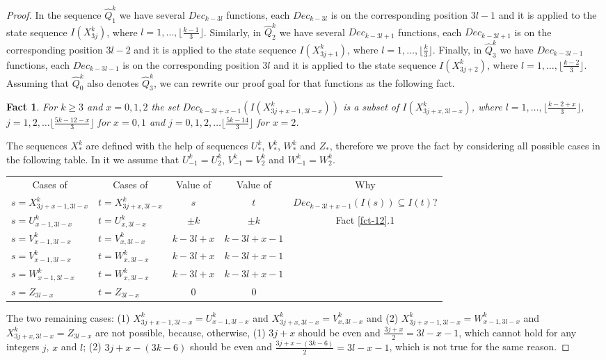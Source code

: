 \documentclass{llncs}
\newtheorem{fact}[theorem]{Fact}
\begin{document}
\begin{proof}
In the sequence $\hat{Q}^k_1$ we have several $Dec_{k-3l}$ functions, each
$Dec_{k-3l}$ is on the corresponding position $3l-1$ and it is applied to the
state sequence $I(X^k_{3j})$, where $l=1,\ldots,\lfloor\frac{k-1}{3} \rfloor$.
Similarly, in $\hat{Q}^k_2$ we have several $Dec_{k-3l+1}$ functions, each
$Dec_{k-3l+1}$ is on the corresponding position $3l-2$ and it is applied to the 
state sequence $I(X^k_{3j+1})$, where $l=1,\ldots,\lfloor\frac{k}{3} \rfloor$.
Finally, in $\hat{Q}^k_3$ we have $Dec_{k-3l-1}$ functions, each $Dec_{k-3l-1}$
is on the corresponding position $3l$ and it is applied to the state sequence
$I(X^k_{3j+2})$, where $l=1,\ldots,\lfloor\frac{k-2}{3}\rfloor$. Assuming that
$\hat{Q}^k_0$ also denotes $\hat{Q}^k_3$, we can rewrite our proof goal for that
functions as the following fact.
\begin{fact}
For $k\ge 3$ and $x=0,1,2$ the set $Dec_{k-3l+x-1}(I(X^k_{3j+x-1,3l-x}))$ is
a subset of $I(X^k_{3j+x,3l-x})$, where $l=1,\ldots,\lfloor\frac{k-2+x}{3}
\rfloor$, $j=1,2,\ldots\lfloor\frac{5k-12-x}{3}\rfloor$ for $x=0,1$ and
$j=0,1,2,\ldots\lfloor\frac{5k-14}{3}\rfloor$ for $x=2$.
\end{fact}
The sequences $X^k_*$ are defined with the help of sequences $U^k_*$, $V^k_*$,
$W^k_*$ and $Z_*$, therefore we prove the fact by considering all possible
cases in the following table. In it we assume that $U^k_{-1}=U^k_2$,
$V^k_{-1}=V^k_2$ and $W^k_{-1}=W^k_2$.
\setlength{\tabcolsep}{3pt}
\begin{center}
\begin{tabular}{||l|l||c|c||c||}
\hline\hline \multicolumn{1}{||c|}{Cases of} & 
      \multicolumn{1}{|c||}{Cases of} & Value of  & Value of  & Why  \\ 
      $s=X^k_{3j+x-1,3l-x}$  & $t=X^k_{3j+x,3l-x}$  & $s$  & $t$  & 
      $Dec_{k-3l+x-1}(I(s)) \subseteq I(t)$? \\ \hline
\hline $s=U^k_{x-1,3l-x}$ & $t=U^k_{x,3l-x}$ & $\pm k$  & $\pm k$  & 
      \multirow{5}{*}{Fact \ref{fct-12}.1}  \\ 
\cline{1-4} $s=V^k_{x-1,3l-x}$ & $t=V^k_{x,3l-x}$ & $k-3l+x$ & $k-3l+x-1$ &\\ 
\cline{1-4} $s=V^k_{x-1,3l-x}$ & $t=W^k_{x,3l-x}$ & $k-3l+x$ & $k-3l+x-1$ &\\ 
\cline{1-4} $s=W^k_{x-1,3l-x}$ & $t=W^k_{x,3l-x}$ & $k-3l+x$ & $k-3l+x-1$ &\\ 
\cline{1-4} $s=Z_{3l-x}$ & $t=Z_{3l-x}$ & 0 & 0 & \\ 
\hline\hline 
\end{tabular}
\end{center}
The two remaining cases: (1) $X^k_{3j+x-1,3l-x} = U^k_{x-1,3l-x}$ and 
$X^k_{3j+x,3l-x} = V^k_{x,3l-x}$ and (2) $X^k_{3j+x-1,3l-x} = W^k_{x-1,3l-x}$ 
and $X^k_{3j+x,3l-x} = Z_{3l-x}$ are not possible, because, otherwise, (1) 
$3j+x$ should be even and $\frac{3j+x}{2} = 3l-x-1$, which cannot hold for 
any integers $j$, $x$ and $l$; (2) $3j+x -(3k-6)$ should be even and 
$\frac{3j+x-(3k-6)}{2} = 3l-x-1$, which is not true for the same reason.


\end{proof}
\end{document}
